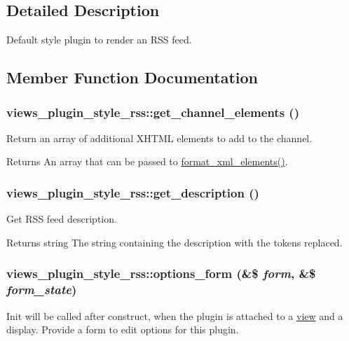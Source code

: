 \subsection{Detailed Description}
Default style plugin to render an RSS feed. 

\subsection{Member Function Documentation}
\hypertarget{classviews__plugin__style__rss_afce443c4f7053fc7e9a2043ae0848cd7}{
\subsubsection[{get\_\-channel\_\-elements}]{\setlength{\rightskip}{0pt plus 5cm}views\_\-plugin\_\-style\_\-rss::get\_\-channel\_\-elements ()}}
\label{classviews__plugin__style__rss_afce443c4f7053fc7e9a2043ae0848cd7}
Return an array of additional XHTML elements to add to the channel.

\begin{DoxyReturn}{Returns}
An array that can be passed to \hyperlink{group__format_gafb344c648e6b63c35950d2889430e4c7}{format\_\-xml\_\-elements()}. 
\end{DoxyReturn}
\hypertarget{classviews__plugin__style__rss_a0f17316df765b758ead202868c44ebba}{
\subsubsection[{get\_\-description}]{\setlength{\rightskip}{0pt plus 5cm}views\_\-plugin\_\-style\_\-rss::get\_\-description ()}}
\label{classviews__plugin__style__rss_a0f17316df765b758ead202868c44ebba}
Get RSS feed description.

\begin{DoxyReturn}{Returns}
string The string containing the description with the tokens replaced. 
\end{DoxyReturn}
\hypertarget{classviews__plugin__style__rss_a317b1867ddd97f969977368031e04fee}{
\subsubsection[{options\_\-form}]{\setlength{\rightskip}{0pt plus 5cm}views\_\-plugin\_\-style\_\-rss::options\_\-form (\&\$ {\em form}, \/  \&\$ {\em form\_\-state})}}
\label{classviews__plugin__style__rss_a317b1867ddd97f969977368031e04fee}
Init will be called after construct, when the plugin is attached to a \hyperlink{classview}{view} and a display. Provide a form to edit options for this plugin. 

